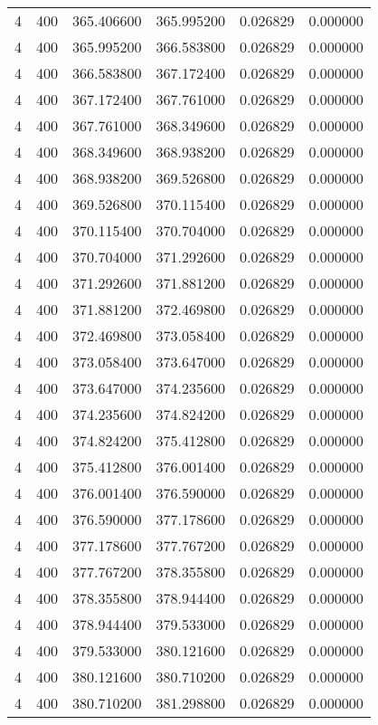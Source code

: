 \begin{longtable}{rrrrrr}
4 & 400 & 365.406600 & 365.995200 & 0.026829 & 0.000000 \\
4 & 400 & 365.995200 & 366.583800 & 0.026829 & 0.000000 \\
4 & 400 & 366.583800 & 367.172400 & 0.026829 & 0.000000 \\
4 & 400 & 367.172400 & 367.761000 & 0.026829 & 0.000000 \\
4 & 400 & 367.761000 & 368.349600 & 0.026829 & 0.000000 \\
4 & 400 & 368.349600 & 368.938200 & 0.026829 & 0.000000 \\
4 & 400 & 368.938200 & 369.526800 & 0.026829 & 0.000000 \\
4 & 400 & 369.526800 & 370.115400 & 0.026829 & 0.000000 \\
4 & 400 & 370.115400 & 370.704000 & 0.026829 & 0.000000 \\
4 & 400 & 370.704000 & 371.292600 & 0.026829 & 0.000000 \\
4 & 400 & 371.292600 & 371.881200 & 0.026829 & 0.000000 \\
4 & 400 & 371.881200 & 372.469800 & 0.026829 & 0.000000 \\
4 & 400 & 372.469800 & 373.058400 & 0.026829 & 0.000000 \\
4 & 400 & 373.058400 & 373.647000 & 0.026829 & 0.000000 \\
4 & 400 & 373.647000 & 374.235600 & 0.026829 & 0.000000 \\
4 & 400 & 374.235600 & 374.824200 & 0.026829 & 0.000000 \\
4 & 400 & 374.824200 & 375.412800 & 0.026829 & 0.000000 \\
4 & 400 & 375.412800 & 376.001400 & 0.026829 & 0.000000 \\
4 & 400 & 376.001400 & 376.590000 & 0.026829 & 0.000000 \\
4 & 400 & 376.590000 & 377.178600 & 0.026829 & 0.000000 \\
4 & 400 & 377.178600 & 377.767200 & 0.026829 & 0.000000 \\
4 & 400 & 377.767200 & 378.355800 & 0.026829 & 0.000000 \\
4 & 400 & 378.355800 & 378.944400 & 0.026829 & 0.000000 \\
4 & 400 & 378.944400 & 379.533000 & 0.026829 & 0.000000 \\
4 & 400 & 379.533000 & 380.121600 & 0.026829 & 0.000000 \\
4 & 400 & 380.121600 & 380.710200 & 0.026829 & 0.000000 \\
4 & 400 & 380.710200 & 381.298800 & 0.026829 & 0.000000 \\

\end{longtable}
